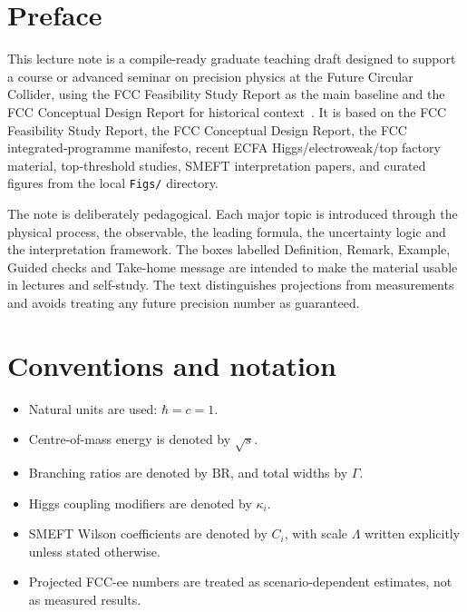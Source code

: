 \documentclass[11pt,a4paper]{article}
\newcommand{\BR}{\mathrm{BR}}
\numberwithin{equation}{section}
\begin{document}
\tableofcontents

\newpage

\section*{Preface}
This lecture note is a compile-ready graduate teaching draft designed to support a course or advanced seminar on precision physics at the Future Circular Collider, using the FCC Feasibility Study Report as the main baseline and the FCC Conceptual Design Report for historical context~\cite{FCCFSRVol1,FCCFSRVol2,FCCFSRVol3,FCCCDRVol1,FCCCDRVol2,FCCCDRVol3}. It is based on the FCC Feasibility Study Report, the FCC Conceptual Design Report, the FCC integrated-programme manifesto, recent ECFA Higgs/electroweak/top factory material, top-threshold studies, SMEFT interpretation papers, and curated figures from the local \texttt{Figs/} directory.

The note is deliberately pedagogical. Each major topic is introduced through the physical process, the observable, the leading formula, the uncertainty logic and the interpretation framework. The boxes labelled Definition, Remark, Example, Guided checks and Take-home message are intended to make the material usable in lectures and self-study. The text distinguishes projections from measurements and avoids treating any future precision number as guaranteed.



\section*{Conventions and notation}
\begin{itemize}[leftmargin=1.7em]
\item Natural units are used: \(\hbar=c=1\).
\item Centre-of-mass energy is denoted by \(\sqrt{s}\).
\item Branching ratios are denoted by \(\BR\), and total widths by \(\Gamma\).
\item Higgs coupling modifiers are denoted by \(\kappa_i\).
\item SMEFT Wilson coefficients are denoted by \(C_i\), with scale \(\Lambda\) written explicitly unless stated otherwise.
\item Projected FCC-ee numbers are treated as scenario-dependent estimates, not as measured results.
\end{itemize}
\end{document}
